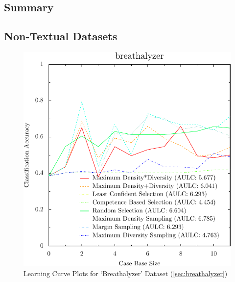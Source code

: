 \documentclass[a4paper,11pt]{report}
\begin{document}
\subsection{Summary}
\begin{table}
\end{table}
\subsection{Non-Textual Datasets}

\begin{figure}[h!]
\includegraphics{./Plots/breathalyzer}
\caption{Learning Curve Plots for `Breathalyzer' Dataset (\ref{sec:breathalyzer})}
\end{figure}
\end{document}
